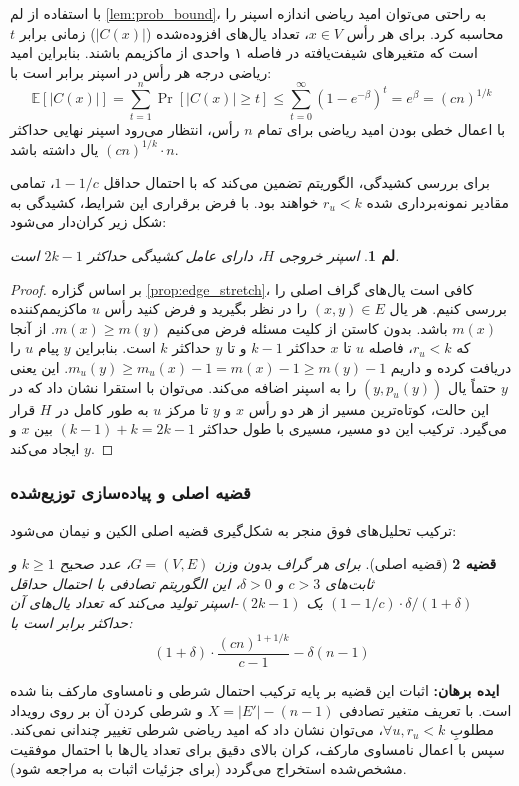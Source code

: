 \documentclass[11pt,a4paper]{report}
\theoremstyle{plain}
\newtheorem{thm}{\normalsize قضیه}[chapter]
\newtheorem{lem}[thm]{\normalsize لم}
\theoremstyle{definition}
\theoremstyle{remark}
\begin{document}
با استفاده از لم \ref{lem:prob_bound}، به راحتی می‌توان امید ریاضی اندازه اسپنر را محاسبه کرد. برای هر رأس $x \in V$، تعداد یال‌های افزوده‌شده ($|C(x)|$) زمانی برابر $t$ است که متغیرهای شیفت‌یافته در فاصله ۱ واحدی از ماکزیمم باشند. بنابراین امید ریاضی درجه هر رأس در اسپنر برابر است با:
\[ \mathbb{E}[|C(x)|] = \sum_{t=1}^n \Pr[|C(x)| \ge t] \le \sum_{t=0}^\infty (1 - e^{-\beta})^t = e^\beta = (cn)^{1/k} \]
با اعمال خطی بودن امید ریاضی برای تمام $n$ رأس، انتظار می‌رود اسپنر نهایی حداکثر $(cn)^{1/k} \cdot n$ یال داشته باشد.

برای بررسی کشیدگی، الگوریتم تضمین می‌کند که با احتمال حداقل $1 - 1/c$، تمامی مقادیر نمونه‌برداری شده $r_u < k$ خواهند بود. با فرض برقراری این شرایط، کشیدگی به شکل زیر کران‌دار می‌شود:

\begin{lem}
اسپنر خروجی $H$، دارای عامل کشیدگی حداکثر $2k - 1$ است.
\end{lem}
\begin{proof}
بر اساس گزاره \ref{prop:edge_stretch}، کافی است یال‌های گراف اصلی را بررسی کنیم. هر یال $(x,y) \in E$ را در نظر بگیرید و فرض کنید رأس $u$ ماکزیمم‌کننده $m(x)$ باشد. بدون کاستن از کلیت مسئله فرض می‌کنیم $m(x) \ge m(y)$. از آنجا که $r_u < k$، فاصله $u$ تا $x$ حداکثر $k-1$ و تا $y$ حداکثر $k$ است. بنابراین $y$ پیام $u$ را دریافت کرده و داریم $m_u(y) \ge m_u(x) - 1 = m(x) - 1 \ge m(y) - 1$. این یعنی $y$ حتماً یال $(y, p_u(y))$ را به اسپنر اضافه می‌کند. می‌توان با استقرا نشان داد که در این حالت، کوتاه‌ترین مسیر از هر دو رأس $x$ و $y$ تا مرکز $u$ به طور کامل در $H$ قرار می‌گیرد. ترکیب این دو مسیر، مسیری با طول حداکثر $(k-1) + k = 2k-1$ بین $x$ و $y$ ایجاد می‌کند.
\end{proof}

\subsubsection{قضیه اصلی و پیاده‌سازی توزیع‌شده}
ترکیب تحلیل‌های فوق منجر به شکل‌گیری قضیه اصلی الکین و نیمان می‌شود:

\begin{thm}[قضیه اصلی]\label{thm:main_elkin}
برای هر گراف بدون وزن $G = (V,E)$، عدد صحیح $k \ge 1$ و ثابت‌های $c > 3$ و $\delta > 0$، این الگوریتم تصادفی با احتمال حداقل $(1 - 1/c) \cdot \delta / (1+\delta)$ یک $(2k-1)$-اسپنر تولید می‌کند که تعداد یال‌های آن حداکثر برابر است با:
\[ (1+\delta) \cdot \frac{(cn)^{1+1/k}}{c-1} - \delta(n-1) \]
\end{thm}
\textbf{ایده برهان:} اثبات این قضیه بر پایه ترکیب احتمال شرطی و نامساوی مارکف بنا شده است. با تعریف متغیر تصادفی $X = |E'| - (n-1)$ و شرطی کردن آن بر روی رویداد مطلوبِ $\forall u, r_u < k$، می‌توان نشان داد که امید ریاضی شرطی تغییر چندانی نمی‌کند. سپس با اعمال نامساوی مارکف، کران بالای دقیق برای تعداد یال‌ها با احتمال موفقیت مشخص‌شده استخراج می‌گردد (برای جزئیات اثبات به \cite{elkin2019efficient} مراجعه شود).
\end{document}

